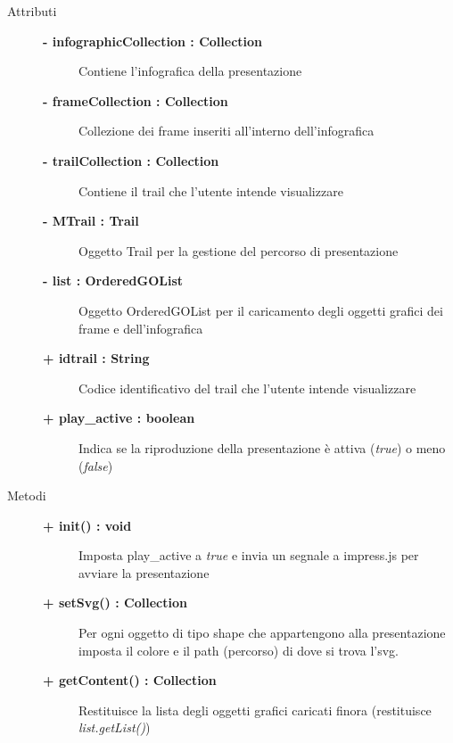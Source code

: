 \begin{description}
	
\item[Attributi] \hfill
	\begin{description}
		\item[\textbf{- infographicCollection : Collection			}] \hfill
			Contiene l'infografica della presentazione
		\item[\textbf{- frameCollection : Collection			}] \hfill
			Collezione dei frame inseriti all'interno dell'infografica
		\item[\textbf{- trailCollection : Collection			}] \hfill
			Contiene il trail che l'utente intende visualizzare
		\item[\textbf{- MTrail : Trail			}] \hfill
			Oggetto Trail per la gestione del percorso di presentazione
		\item[\textbf{- list : OrderedGOList			}] \hfill
			Oggetto OrderedGOList per il caricamento degli oggetti grafici dei frame e dell'infografica
		\item[\textbf{+ idtrail : String			}] \hfill
			Codice identificativo del trail che l'utente intende visualizzare
		\item[\textbf{+ play\_active : boolean			}] \hfill
			Indica se la riproduzione della presentazione è attiva (\textit{true}) o meno (\textit{false})
	\end{description}
	
	
\item[Metodi] \hfill

	\begin{description}
		\item[\textbf{\color{blue}+ init() : void			}] \hfill
			Imposta play\_active a \textit{true} e invia un segnale a impress.js per avviare la presentazione
			
	\end{description}
	
	\begin{description}
		\item[\textbf{\color{blue}+ setSvg() : Collection			}] \hfill
			Per ogni oggetto di tipo shape che appartengono alla presentazione imposta il colore e il path (percorso) di dove si trova l'svg.
			
	\end{description}
	
	\begin{description}
		\item[\textbf{\color{blue}+ getContent() : Collection			}] \hfill
			Restituisce la lista degli oggetti grafici caricati finora (restituisce \textit{list.getList()})
			

\end{description}
\end{description}

